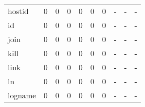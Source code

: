 \begin{longtable}{lp{2.0cm}p{2.0cm}p{2.0cm}p{2.0cm}p{2.0cm}p{2.0cm}p{2.0cm}p{2.0cm}p{2.0cm}}
hostid    &                      0 &                                             0 &                                            0 &                                           0 &                                            0 &                                          0 &                                    - &                                      - &                                    - \\
id        &                      0 &                                             0 &                                            0 &                                           0 &                                            0 &                                          0 &                                    - &                                      - &                                    - \\
join      &                      0 &                                             0 &                                            0 &                                           0 &                                            0 &                                          0 &                                    - &                                      - &                                    - \\
kill      &                      0 &                                             0 &                                            0 &                                           0 &                                            0 &                                          0 &                                    - &                                      - &                                    - \\
link      &                      0 &                                             0 &                                            0 &                                           0 &                                            0 &                                          0 &                                    - &                                      - &                                    - \\
ln        &                      0 &                                             0 &                                            0 &                                           0 &                                            0 &                                          0 &                                    - &                                      - &                                    - \\
logname   &                      0 &                                             0 &                                            0 &                                           0 &                                            0 &                                          0 &                                    - &                                      - &                                    - \\

\end{longtable}
